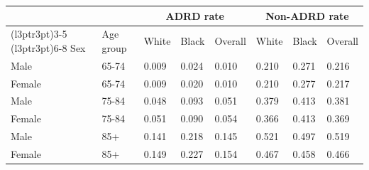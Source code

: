 
\begin{tabular}{llllllll}
\toprule
\multicolumn{2}{c}{ } & \multicolumn{3}{c}{ADRD rate} & \multicolumn{3}{c}{Non-ADRD rate} \\
\cmidrule(l{3pt}r{3pt}){3-5} \cmidrule(l{3pt}r{3pt}){6-8}
Sex & Age group & White & Black & Overall & White & Black & Overall\\
\midrule
Male & 65-74 & 0.009 & 0.024 & 0.010 & 0.210 & 0.271 & 0.216\\
Female & 65-74 & 0.009 & 0.020 & 0.010 & 0.210 & 0.277 & 0.217\\
Male & 75-84 & 0.048 & 0.093 & 0.051 & 0.379 & 0.413 & 0.381\\
Female & 75-84 & 0.051 & 0.090 & 0.054 & 0.366 & 0.413 & 0.369\\
Male & 85+ & 0.141 & 0.218 & 0.145 & 0.521 & 0.497 & 0.519\\
\addlinespace
Female & 85+ & 0.149 & 0.227 & 0.154 & 0.467 & 0.458 & 0.466\\
\bottomrule
\end{tabular}
